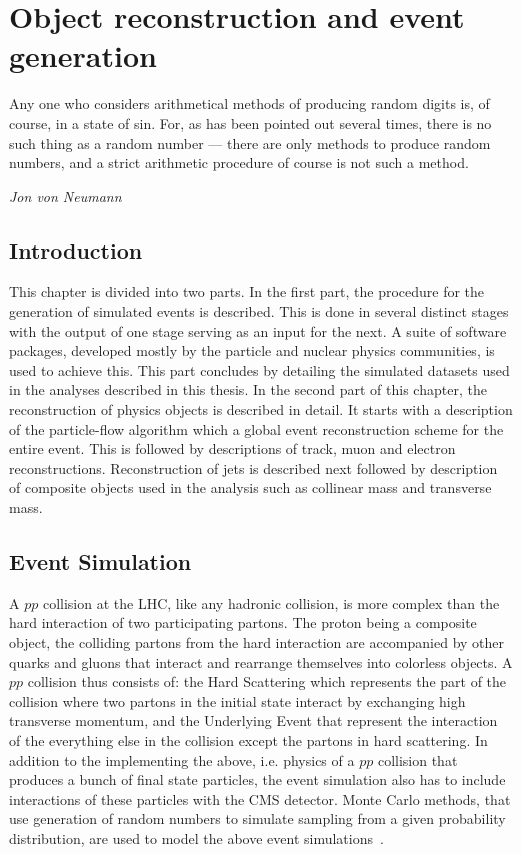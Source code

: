 
%
%

\chapter{Object reconstruction and event generation}
\label{chap:event_sim}
\epigraph{Any one who considers arithmetical methods of producing random digits is, of course, in a state of sin. For, as has been pointed out several times, there is no such thing as a random number --- there are only methods to produce random numbers, and a strict arithmetic procedure of course is not such a method.}{\textit{Jon von Neumann}}
\section{Introduction}
\label{intro}
This chapter is divided into two parts. In the first part, the procedure for the generation of simulated events is described. This is done in several distinct stages with the output of one stage serving as an input for the next. A suite of software packages, developed mostly by the particle and nuclear physics communities, is used to achieve this. This part concludes by detailing the simulated datasets used in the analyses described in this thesis. In the second part of this chapter, the reconstruction of physics objects is described in detail. It starts with a description of the particle-flow algorithm which a global event reconstruction scheme for the entire event. This is followed by descriptions of track, muon and electron reconstructions. Reconstruction of jets is described next followed by description of composite objects used in the analysis such as collinear mass and transverse mass.
 

\section{Event Simulation}
A $pp$ collision at the LHC, like any hadronic collision, is more complex than the hard interaction of two participating partons. The proton being a composite object, the colliding partons from the hard interaction are accompanied by other quarks and gluons that interact and rearrange themselves into colorless objects. A $pp$ collision thus consists of: the Hard Scattering which represents the part of the collision where two partons in the initial state interact by exchanging high transverse momentum, and the Underlying Event that represent the interaction of the everything else in the collision except the partons in hard scattering. In addition to the implementing the above, i.e. physics of a $pp$ collision  that produces a bunch of final state particles, the event simulation also has to include interactions of these particles with the CMS detector. Monte Carlo methods, that use generation of random numbers to simulate sampling from a given probability distribution, are used to model the above event simulations~\cite{mc_evtsim}.

